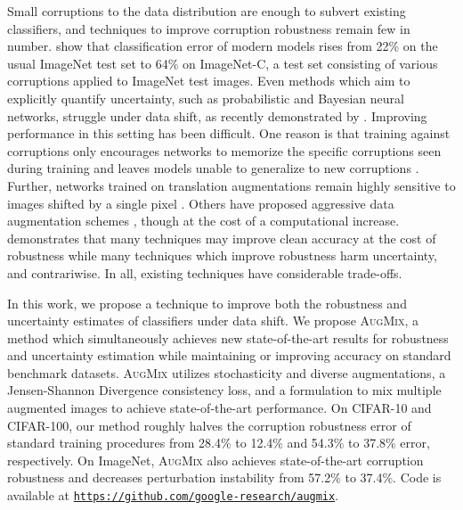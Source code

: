 \documentclass{article} \usepackage{iclr2020_conference,times}
\begin{document}
Small corruptions to the data distribution are enough to subvert existing classifiers, and techniques to improve corruption robustness remain few in number.
\citet{hendrycks2019robustness} show that classification error of modern models rises from 22\% on the usual ImageNet test set to 64\% on ImageNet-C, a test set consisting of various corruptions applied to ImageNet test images. Even methods which aim to explicitly quantify uncertainty, such as probabilistic and Bayesian neural networks, struggle under data shift, as recently demonstrated by \citet{ovadia2019can}.
Improving performance in this setting has been difficult.
One reason is that training against corruptions only encourages networks to memorize the specific corruptions seen during training and leaves models unable to generalize to new corruptions \citep{igor, geirhos}. Further, networks trained on translation augmentations remain highly sensitive to images shifted by a single pixel \citep{gu2019using, hendrycks2019robustness}. Others have proposed aggressive data augmentation schemes \citep{Cubuk2018AutoAugmentLA}, though at the cost of a computational increase. \citet{empiricalpaper} demonstrates that many techniques may improve clean accuracy at the cost of robustness while many techniques which improve robustness harm uncertainty, and contrariwise. In all, existing techniques have considerable trade-offs.

In this work, we propose a technique to improve both the robustness and uncertainty estimates of classifiers under data shift.
We propose \textsc{AugMix}, a method which simultaneously achieves new state-of-the-art results for robustness and uncertainty estimation while maintaining or improving accuracy on standard benchmark datasets. \textsc{AugMix} utilizes stochasticity and diverse augmentations, a Jensen-Shannon Divergence consistency loss, and a formulation to mix multiple augmented images to achieve state-of-the-art performance. On CIFAR-10 and CIFAR-100, our method roughly halves the corruption robustness error of standard training procedures from 28.4\% to 12.4\% and 54.3\% to 37.8\% error, respectively. On ImageNet, \textsc{AugMix} also achieves state-of-the-art corruption robustness and decreases perturbation instability from 57.2\% to 37.4\%. Code is available at
\href{https://github.com/google-research/augmix}{\texttt{https://github.com/google-research/augmix}}.
\end{document}
